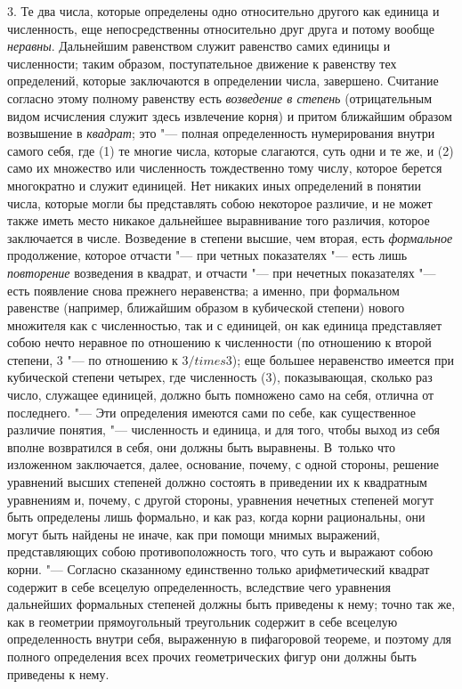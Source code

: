 3. Те два числа, которые определены одно относительно другого как единица и
численность, еще непосредственны относительно друг друга и потому вообще
{\em неравны}. Дальнейшим равенством служит равенство
самих единицы и численности; таким образом, поступательное движение к
равенству тех определений, которые заключаются в определении числа,
завершено. Считание согласно этому полному равенству есть
{\em возведение в степень} (отрицательным видом
исчисления служит здесь извлечение корня) и притом ближайшим образом
возвышение в {\em квадрат}; это "--- полная определенность
нумерирования внутри самого себя, где (1) те многие числа, которые
слагаются, суть одни и те же, и (2) само их множество или численность
тождественно тому числу, которое берется многократно и служит единицей. Нет
никаких иных определений в понятии числа, которые могли бы представлять
собою некоторое различие, и не может также иметь место никакое дальнейшее
выравнивание того различия, которое заключается в числе. Возведение в
степени высшие, чем вторая, есть {\em формальное}
продолжение, которое отчасти "--- при четных показателях "--- есть лишь
{\em повторение} возведения в квадрат, и отчасти "--- при
нечетных показателях "--- есть появление снова прежнего неравенства; а именно,
при формальном равенстве (например, ближайшим образом в кубической степени)
нового множителя как с численностью, так и с единицей, он как единица
представляет собою нечто неравное по отношению к численности (по отношению
к второй степени, 3 "--- по отношению к $3 /times 3$); еще большее неравенство имеется
при кубической степени четырех, где численность (3), показывающая, сколько
раз число, служащее единицей, должно быть помножено само на себя, отлична
от последнего. "--- Эти определения имеются сами по себе, как существенное
различие понятия, "--- численность и единица, и для того, чтобы выход из себя
вполне возвратился в себя, они должны быть выравнены. В~только что
изложенном заключается, далее, основание, почему, с одной стороны, решение
уравнений высших степеней должно состоять в приведении их к квадратным
уравнениям и, почему, с другой стороны, уравнения нечетных степеней могут
быть определены лишь формально, и как раз, когда корни рациональны, они
могут быть найдены не иначе, как при помощи мнимых выражений,
представляющих собою противоположность того, что суть и выражают собою
корни. "--- Согласно сказанному единственно только арифметический квадрат
содержит в себе всецелую определенность, вследствие чего уравнения
дальнейших формальных степеней должны быть приведены к нему; точно так же,
как в геометрии прямоугольный треугольник содержит в себе всецелую
определенность внутри себя, выраженную в пифагоровой теореме, и поэтому для
полного определения всех прочих геометрических фигур они должны быть
приведены к нему.

